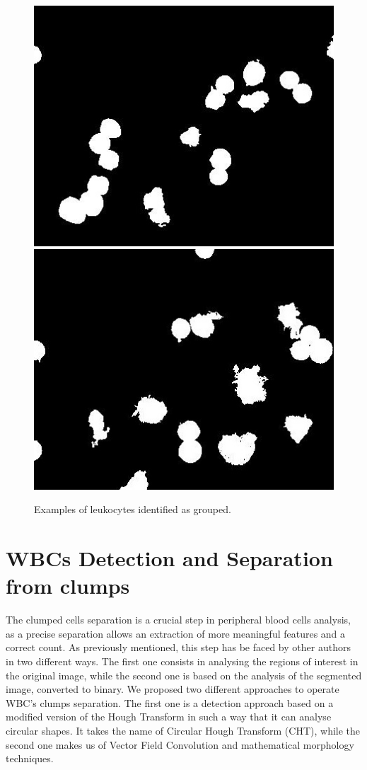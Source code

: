 \documentclass[final,a4paper,12pt,english]{UnicaPhdThesis3}
\begin{document}
\begin{figure}[!htbp]
\centering
\includegraphics[height=0.27\textheight]{images/Fig12-1}
\includegraphics[height=0.27\textheight]{images/Fig12-2}
\caption{\label{fig:example10}Examples of leukocytes identified as grouped.}
\end{figure}

\section{WBCs Detection and Separation from clumps} %
The clumped cells separation is a crucial step in peripheral blood cells analysis, as a precise separation allows an extraction of more meaningful features and a correct count. As previously mentioned, this step has be faced by other authors in two different ways. The first one consists in analysing the regions of interest in the original image, while the second one is based on the analysis of the segmented image, converted to binary. We proposed two different approaches to operate WBC's clumps separation. The first one is a detection approach based on a modified version of the Hough Transform in such a way that it can analyse circular shapes. It takes the name of Circular Hough Transform (CHT), while the second one makes us of Vector Field Convolution and mathematical morphology techniques. 
\end{document}
